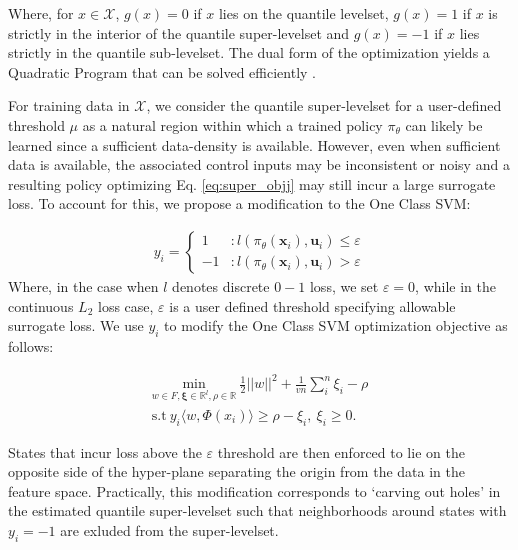 \documentclass[10pt, conference]{ieeeconf}      %
\newcommand{\bu}{\mathbf{u}}
\newcommand{\bx}{\mathbf{x}}
\begin{document}
Where, for $x\in \mathcal{X}$, $g(x)=0$ if $x$ lies on the quantile levelset,
$g(x) = 1$ if $x$ is strictly in the interior of the quantile super-levelset and $g(x) = -1$ 
if $x$ lies strictly in the quantile sub-levelset. The dual form of the optimization yields a Quadratic Program 
that can be solved efficiently \cite{scholkopf2001estimating}. 

For training data in $\mathcal{X}$, we consider the quantile super-levelset for a user-defined threshold $\mu$ as a natural region within which
a trained policy $\pi_{\theta}$ can likely be learned since a sufficient data-density is available.
However, even when sufficient data is available, the associated control inputs may be inconsistent or noisy and a resulting policy
optimizing Eq. \ref{eq:super_objj} may still incur a large surrogate loss. To account for this, we propose a
modification to the One Class SVM:

\begin{align}
y_i = \left\{
     \begin{array}{lr}
         1 & : l(\pi_{\theta}(\bx_i),\bu_i)\le \varepsilon\\
         -1 & : l(\pi_{\theta}(\bx_i),\bu_i)>\varepsilon
     \end{array}
   \right.
\end{align}
Where, in the case when $l$ denotes discrete $0-1$ loss, we set $\varepsilon = 0$, while in the continuous $L_2$ loss
case, $\varepsilon$ is a user defined threshold specifying allowable surrogate loss.
We use $y_i$ to modify the One Class SVM optimization objective as follows: 

\vspace{-2ex}
\begin{align}\label{eq:primal_sup}
    \underset{w\in F, \mathbf{\xi} \in \mathbb{R}^l, \rho \in \mathbb{R}}{\mbox{min}}\: \frac{1}{2}||w||^2+\frac{1}{vn} \sum^n_i \xi_i - \rho\\
\mbox{s.t} \: y_i \langle w,\Phi(x_i)\rangle \geq \rho - \xi_i, \: \xi_i \geq 0 \label{eq:ineq}.
\end{align}

States that incur loss above the $\varepsilon$ threshold are then enforced to lie on the opposite side of the
hyper-plane separating the origin from the data in the feature space. Practically, this modification corresponds to
`carving out holes' in the estimated quantile super-levelset such that neighborhoods around states with $y_i=-1$ are
exluded from the super-levelset.
\end{document}
